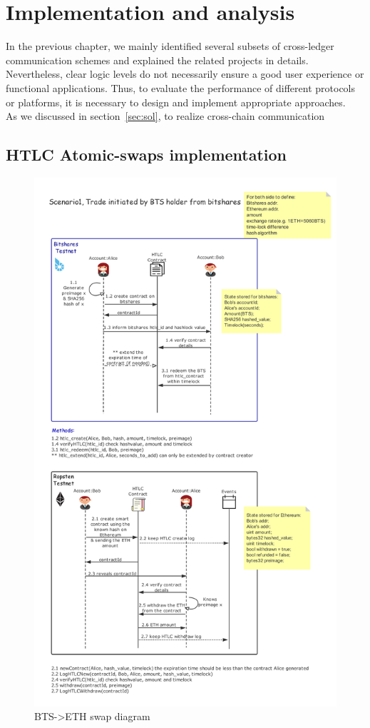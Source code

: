 \chapter{Implementation and analysis} 
\label{chap:4}
\noindent In the previous chapter, we mainly identified several subsets of cross-ledger communication schemes and explained the related projects in details. Nevertheless, clear logic levels do not necessarily ensure a good user experience or functional applications. Thus, to evaluate the performance of different protocols or platforms, it is necessary to design and implement appropriate approaches. \\
\noindent As we discussed in section~\ref{sec:sol}, to realize cross-chain communication 

\section{HTLC Atomic-swaps implementation}
\noindent 
\newpage
\begin{figure}[H]
	\includegraphics[width=1\textwidth]{./figures/BTS-ETH_diagram}
        \centering
        \caption{BTS->ETH swap diagram}
        \centering
        \label{fig:success}

\end{figure}

